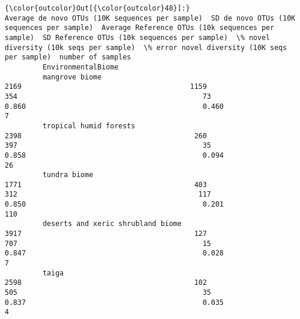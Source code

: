\documentclass{article}
\begin{document}
            \begin{Verbatim}[commandchars=\\\{\}]
{\color{outcolor}Out[{\color{outcolor}48}]:}                                                        Average de novo OTUs (10K sequences per sample)  SD de novo OTUs (10K sequences per sample)  Average Reference OTUs (10k sequences per sample)  SD Reference OTUs (10k sequences per sample)  \% novel diversity (10k seqs per sample)  \% error novel diversity (10K seqs per sample)  number of samples
         EnvironmentalBiome                                                                                                                                                                                                                                                                                                                                            
         mangrove biome                                                                                    2169                                        1159                                                354                                            73                                    0.860                                          0.460                  7
         tropical humid forests                                                                            2398                                         260                                                397                                            35                                    0.858                                          0.094                 26
         tundra biome                                                                                      1771                                         403                                                312                                           117                                    0.850                                          0.201                110
         deserts and xeric shrubland biome                                                                 3917                                         127                                                707                                            15                                    0.847                                          0.028                  7
         taiga                                                                                             2598                                         102                                                505                                            35                                    0.837                                          0.035                  4

\end{Verbatim}
\end{document}
